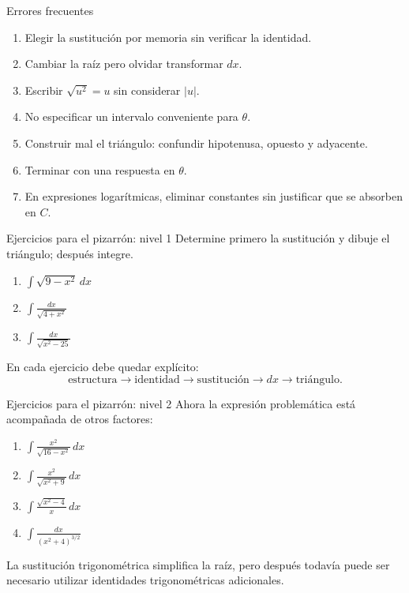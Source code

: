 \documentclass[10pt,aspectratio=169]{beamer}
\begin{document}
\begin{frame}{Errores frecuentes}
\begin{enumerate}
\item Elegir la sustitución por memoria sin verificar la identidad.
\item Cambiar la raíz pero olvidar transformar $dx$.
\item Escribir $\sqrt{u^2}=u$ sin considerar $|u|$.
\item No especificar un intervalo conveniente para $\theta$.
\item Construir mal el triángulo: confundir hipotenusa, opuesto y adyacente.
\item Terminar con una respuesta en $\theta$.
\item En expresiones logarítmicas, eliminar constantes sin justificar que se absorben en $C$.
\end{enumerate}
\end{frame}

\begin{frame}{Ejercicios para el pizarrón: nivel 1}
Determine primero la sustitución y dibuje el triángulo; después integre.
\begin{enumerate}
\item $\displaystyle \int\sqrt{9-x^2}\,dx$
\item $\displaystyle \int\frac{dx}{\sqrt{4+x^2}}$
\item $\displaystyle \int\frac{dx}{\sqrt{x^2-25}}$
\end{enumerate}
\vspace{2mm}
En cada ejercicio debe quedar explícito:
\[
\text{estructura}\to\text{identidad}\to\text{sustitución}\to dx\to\text{triángulo}.
\]
\end{frame}

\begin{frame}{Ejercicios para el pizarrón: nivel 2}
Ahora la expresión problemática está acompañada de otros factores:
\begin{enumerate}
\item $\displaystyle \int\frac{x^2}{\sqrt{16-x^2}}\,dx$
\item $\displaystyle \int\frac{x^2}{\sqrt{x^2+9}}\,dx$
\item $\displaystyle \int\frac{\sqrt{x^2-4}}{x}\,dx$
\item $\displaystyle \int\frac{dx}{(x^2+4)^{3/2}}$
\end{enumerate}
La sustitución trigonométrica simplifica la raíz, pero después todavía puede ser necesario utilizar identidades trigonométricas adicionales.
\end{frame}
\end{document}
